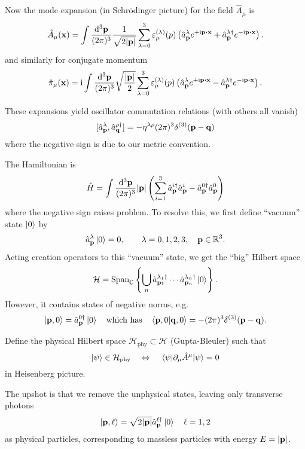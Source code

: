 \documentclass[a4paper,11pt]{article}
\begin{document}
	Now the mode expansion (in Schr\"odinger picture) for the field $\hat A_\mu$ is
	\begin{equation*}
		\hat A_\mu (\vb x) = \int \ddk{\vb p}{3} \frac{1}{\sqrt{2 \abs{\vb p}}} \sum _{\lambda = 0}^3 \varepsilon ^{(\lambda)}_\mu(p) \left( \hat a _{\vb p}^\lambda e ^{+ \mathrm{i} \vb p \vdot \vb x} + \hat a^{\lambda\dagger}_{\vb p} e ^{- \mathrm{i} \vb p \vdot \vb x} \right).
	\end{equation*}
	and similarly for conjugate momentum
	\[
		\hat \pi_\mu(\vb x) = \mathrm{i} \int \ddk{\vb p}{3} \sqrt{\frac{\abs{\vb p}}{2}} \sum_{\lambda = 0}^3 \varepsilon ^{(\lambda)}_\mu(p) \left( \hat a ^{\lambda}_{\vb p} e ^{+ \mathrm{i} \vb p \vdot \vb x} - \hat a^{\lambda\dagger}_{\vb p} e ^{-\mathrm{i} \vb p \vdot \vb x} \right).
	\]
	
	These expansions yield oscillator commutation relations (with others all vanish)
	\[
		[\hat a ^{\lambda}_{\vb p}, \hat a ^{\rho\dagger}_{\vb q}] = - \eta ^{\lambda \rho} (2 \pi)^3 \delta ^{(3)}(\vb p - \vb q)
	\]
	where the negative sign is due to our metric convention.

	The Hamiltonian is 
	\[
		\hat H = \int \frac{\dd[3]{\vb p}}{(2\pi)^{3}} \abs{\vb p} \left( \sum _{i = 1}^3 \hat a ^{i\dagger}_{\vb p} \hat a^i _{\vb p} - \hat a ^{0 \dagger}_{\vb p} \hat a^0 _{\vb p} \right)
	\]
	where the negative sign raises problem. To resolve this, we first define ``vacuum'' state $\ket{0}$ by 
	\[
		\hat a ^{\lambda}_{\vb p} \ket{0} = 0, \qquad \lambda = 0,1,2,3, \quad \vb p \in \mathbb{R}^3.
	\]
	Acting creation operators to this ``vacuum'' state, we get the ``big'' Hilbert space 
	\[
		\mathcal{H} = \operatorname{Span} _{\mathbb{C}}\left\{ \bigcup_n \hat a^{\lambda_1\dagger}_{\vb p_1} \cdots \hat a^{\lambda_n\dagger} _{\vb p_n} \ket{0}\right\}.
	\]
	However, it contains states of negative norms, e.g. 
	\[
		\ket{\vb p, 0} = \hat a^{0\dagger} _{\vb p}\ket{0} \quad \text{which has} \quad \braket{\vb p, 0}{\vb q, 0} = - (2 \pi)^3 \delta ^{(3)}(\vb p - \vb q).
	\]
	
	Define the physical Hilbert space $\mathcal{H}_{\text{phy}} \subset \mathcal{H}$ (Gupta-Bleuler) such that 
	\[
		\ket{\psi} \in \mathcal{H}_{\text{phy}} \quad \Leftrightarrow \quad \mel{\psi}{\partial_\mu \hat A^\mu}{\psi} = 0
	\]
	in Heisenberg picture.

	The upshot is that we remove the unphysical states, leaving only transverse photons
	\[
		\ket{\vb p, \ell} = \sqrt{2 \abs{\vb p}} \hat a^{\ell\dagger}_{\vb p} \ket{0} \quad \ell = 1,2
	\]
	as physical particles, corresponding to massless particles with energy $E = \abs{\vb p}$.

	
	
	  
\end{document}
